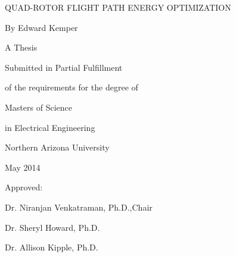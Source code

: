 \documentclass[12pt, letterpaper, oneside]{Thesis} %
\title{\ttitle} %
\begin{document}
\frontmatter %


\pagestyle{plain} %

\newcommand{\HRule}{\rule{\linewidth}{0.5mm}} %
\newcommand{\p}{\partial}
\newcommand{\spa}{\text{ }}
\newcommand{\cc}{\mathfrak{C}} %
\hypersetup{pdfsubject=\subjectname}
\hypersetup{pdfauthor=\authornames}
\hypersetup{pdfkeywords=\keywordnames}


\begin{titlepage}
\begin{center}

QUAD-ROTOR FLIGHT PATH ENERGY OPTIMIZATION
\vspace{15 mm}

By Edward Kemper

A Thesis

Submitted in Partial Fulfillment

of the requirements for the degree of

Masters of Science

in Electrical Engineering
\vspace{15 mm}

Northern Arizona University

May 2014
\vspace{20 mm}

Approved:

Dr. Niranjan Venkatraman, Ph.D.,Chair

Dr. Sheryl Howard, Ph.D.

Dr. Allison Kipple, Ph.D.



\clearpage
\maketitle
\thispagestyle{empty}

\end{center}
\clearpage
\maketitle
\thispagestyle{empty}
\end{titlepage}
\end{document}
